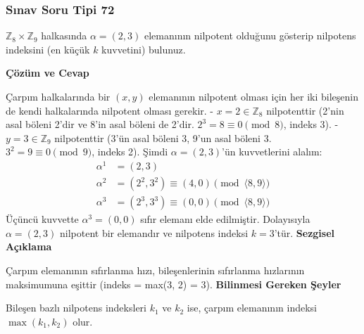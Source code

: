 \documentclass[11pt, a4paper]{article}
\newenvironment{cozum}{
    \vspace{0.5cm}
    \noindent\textcolor{green!60!black}{\faCheckCircle\enspace \textbf{\Large Çözüm ve Cevap}}\par\vspace{0.2cm}
}{}
\newenvironment{sezgisel}{
    \vspace{0.5cm}
    \noindent\textcolor{orange!80!black}{\faLightbulb\enspace \textbf{\Large Sezgisel Açıklama}}\par\vspace{0.2cm}
    \itshape
}{}
\newenvironment{bilgi}{
    \vspace{0.5cm}
    \noindent\textcolor{red!70!black}{\faExclamationTriangle\enspace \textbf{\Large Bilinmesi Gereken Şeyler}}\par\vspace{0.2cm}
}{}
\begin{document}
\newpage
\subsubsection{Sınav Soru Tipi 72}
\begin{sinavbox}
$\mathbb{Z}_{8} \times \mathbb{Z}_{9}$ halkasında $\alpha = (2, 3)$ elemanının nilpotent olduğunu gösterip nilpotens indeksini (en küçük $k$ kuvvetini) bulunuz.
\end{sinavbox}
\begin{cozum}
Çarpım halkalarında bir $(x, y)$ elemanının nilpotent olması için her iki bileşenin de kendi halkalarında nilpotent olması gerekir.
- $x = 2 \in \mathbb{Z}_8$ nilpotenttir (2'nin asal böleni 2'dir ve 8'in asal böleni de 2'dir. $2^3 = 8 \equiv 0 \pmod 8$, indeks 3).
- $y = 3 \in \mathbb{Z}_9$ nilpotenttir (3'ün asal böleni 3, 9'un asal böleni 3. $3^2 = 9 \equiv 0 \pmod 9$, indeks 2).
Şimdi $\alpha = (2, 3)$'ün kuvvetlerini alalım:
\begin{align*}
\alpha^1 &= (2, 3) \\
\alpha^2 &= (2^2, 3^2) \equiv (4, 0) \pmod{\langle 8, 9 \rangle} \\
\alpha^3 &= (2^3, 3^3) \equiv (0, 0) \pmod{\langle 8, 9 \rangle}
\end{align*}
Üçüncü kuvvette $\alpha^3 = (0, 0)$ sıfır elemanı elde edilmiştir.
Dolayısıyla $\alpha = (2, 3)$ nilpotent bir elemandır ve nilpotens indeksi $k = 3$'tür.
\end{cozum}
\begin{sezgisel}
Çarpım elemanının sıfırlanma hızı, bileşenlerinin sıfırlanma hızlarının maksimumuna eşittir (indeks = max(3, 2) = 3).
\end{sezgisel}
\begin{bilgi}
Bileşen bazlı nilpotens indeksleri $k_1$ ve $k_2$ ise, çarpım elemanının indeksi $\max(k_1, k_2)$ olur.
\end{bilgi}

\newpage
\end{document}
